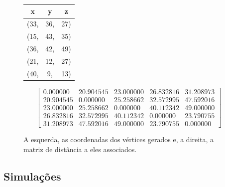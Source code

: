 \documentclass[a4paper,12pt]{article}
\begin{document}
	\begin{figure}[H]
	\begin{center}
		\begin{minipage}{0.15 \linewidth}
			\begin{table}[H]
				\centering
				\begin{tabular}{ |c c c| } 
					\hline
					\textbf{x} & \textbf{y} & \textbf{z} \\\hline
					(33, & 36, & 27)\\

					(15, & 43, & 35)\\

					(36, & 42, & 49)\\

					(21, & 12, & 27)\\

					(40, & 9, & 13)\\\hline

				\end{tabular}
				\label{tab:re1}
			\end{table}
		\end{minipage}
	\hspace{0.1cm}
		\begin{minipage}{0.8 \linewidth}
			$$
			\begin{bmatrix}
			 0.000000 & 20.904545 & 23.000000 & 26.832816 & 31.208973\\

			20.904545 & 0.000000 & 25.258662 & 32.572995 & 47.592016\\

			23.000000 & 25.258662 & 0.000000 & 40.112342 & 49.000000\\

			26.832816 & 32.572995 & 40.112342 & 0.000000 & 23.790755\\

			31.208973 & 47.592016 & 49.000000 & 23.790755 & 0.000000	
			\end{bmatrix}
			$$
		\end{minipage}
	\end{center}
\caption{A esquerda, as coordenadas dos vértices gerados e, a direita, a matriz de distância a eles associados.}
\label{fig:inst}
\end{figure}
	
	\subsection{Simulações}
	
\end{document}
